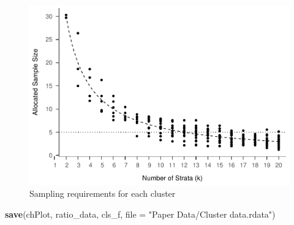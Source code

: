 \documentclass[man]{apa6}
\newenvironment{Shaded}{\begin{snugshade}}{\end{snugshade}}
\newcommand{\DataTypeTok}[1]{\textcolor[rgb]{0.13,0.29,0.53}{#1}}
\newcommand{\KeywordTok}[1]{\textcolor[rgb]{0.13,0.29,0.53}{\textbf{#1}}}
\newcommand{\NormalTok}[1]{#1}
\newcommand{\StringTok}[1]{\textcolor[rgb]{0.31,0.60,0.02}{#1}}
\begin{document}
\begin{figure}
\centering
\includegraphics{GenSamp_Paper_Code_files/figure-latex/fig-k-size-1.pdf}
\caption{\label{fig:fig-k-size}Sampling requirements for each cluster}
\end{figure}

\begin{Shaded}
\begin{Highlighting}[]
\KeywordTok{save}\NormalTok{(chPlot, ratio_data, cls_f, }\DataTypeTok{file =} \StringTok{"Paper Data/Cluster data.rdata"}\NormalTok{)}
\end{Highlighting}
\end{Shaded}
\end{document}
